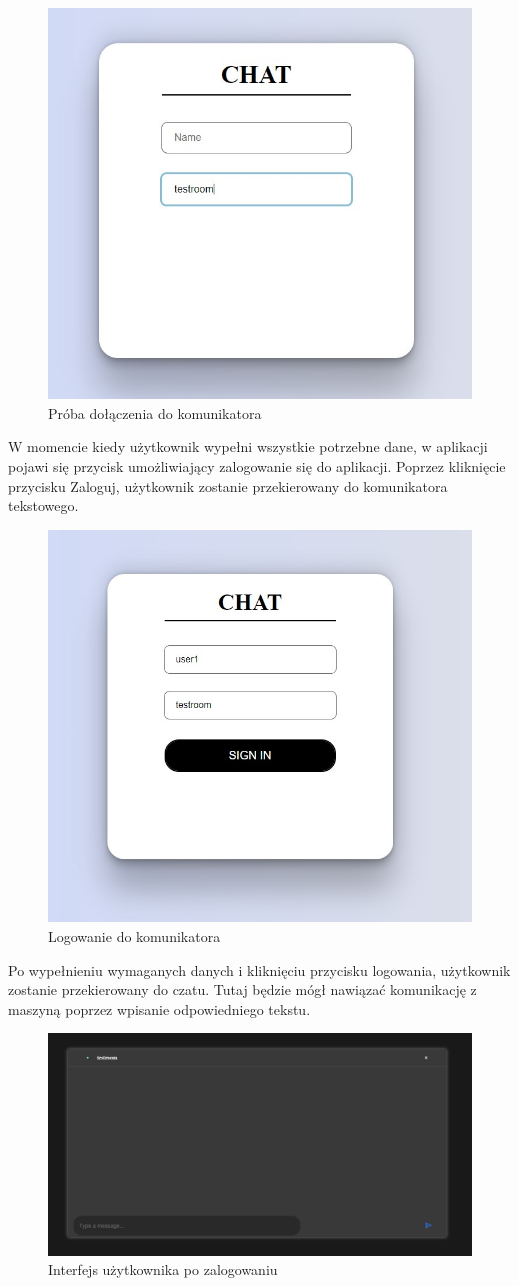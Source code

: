 \begin{figure}[htbp]
	\centering
	\includegraphics[width=0.5\linewidth]{"obrazy/TESTnazwapokoju"}
	\caption{Próba dołączenia do komunikatora}
	\label{fig:40}
\end{figure}
\newpage
W momencie kiedy użytkownik wypełni wszystkie potrzebne dane, w aplikacji pojawi się przycisk umożliwiający zalogowanie się do aplikacji. Poprzez kliknięcie przycisku Zaloguj, użytkownik zostanie przekierowany do komunikatora tekstowego.
\begin{figure}[htbp]
	\centering
	\includegraphics[width=0.5\linewidth]{"obrazy/TESTdolaczenie"}
	\caption{Logowanie do komunikatora}
	\label{fig:41}
\end{figure}
\newpage
Po wypełnieniu wymaganych danych i kliknięciu przycisku logowania, użytkownik zostanie przekierowany do czatu. Tutaj będzie mógł nawiązać komunikację z maszyną poprzez wpisanie odpowiedniego tekstu.
\begin{figure}[htbp]
	\centering
	\includegraphics[width=0.5\linewidth]{"obrazy/TESTczatpodolaczeniu"}
	\caption{Interfejs użytkownika po zalogowaniu}
	\label{fig:42}
\end{figure}

